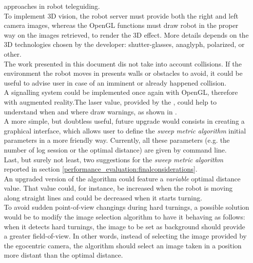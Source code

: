 approaches in robot teleguiding.
\\
To implement 3D vision, the robot server must provide both the right and left camera images,
whereas the OpenGL functions must draw robot in the proper way on the images retrieved, to render
the 3D effect. More details depends on the 3D technologies chosen by the developer: shutter-glasses,
anaglyph, polarized, or other.
\\
The work presented in this document dis not take into account 
collisions. If the environment the robot moves in presents walls 
or obstacles to avoid, it could be useful to advise user in case 
of an imminent or already happened collision.
\\
A signalling system could be implemented once again with OpenGL, therefore 
with augmented reality.The laser value, provided by the \morduc{},
could help to understand when and where draw warnings, as shown in 
\cite{morduc:macalusodetommaso}.
\\
A more simple, but doubtless useful, future upgrade would consists in 
creating a graphical interface, which allows user to define the
\textit{sweep metric algorithm} initial parameters in a more friendly way. 
Currently, all these parameters (e.g. the number of log session or the 
optimal distance) are given by command line.
\\
Last, but surely not least, two suggestions for the 
\textit{sweep metric algorithm} reported in section 
\ref{performance_evaluation:finalconsiderations}.
\\
An upgraded version of the algorithm could feature a 
\textit{variable} optimal distance value. That value 
could, for instance, be increased when the robot is moving 
along straight lines and could be decreased when it starts 
turning.
\\
To avoid sudden point-of-view changings during hard turnings, 
a possible solution would be to modify the image selection algorithm 
to have it behaving as follows: when it detects hard turnings, the 
image to be set as background should provide a greater field-of-view. 
In other words, instead of selecting the image provided by the 
egocentric camera, the algorithm should select an image taken 
in a position more distant than the optimal distance.
